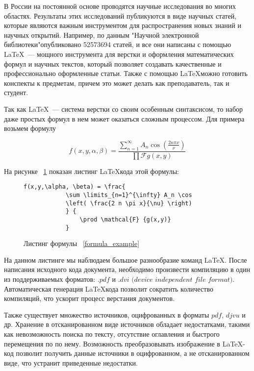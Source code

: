 \introduction %

В России на постоянной основе проводятся научные исследования во многих областях. Результаты этих исследований публикуются в виде научных статей, которые являются важным инструментом для распространения новых знаний и научных открытий.
Например, по данным "Научной электронной библиотеки"\;опубликовано 52573694 \cite{eLib} статей, и все они написаны с помощью \LaTeX ~--- мощного инструмента для верстки и оформления математических формул и научных текстов, который позволяет создавать качественные и профессионально оформленные статьи. 
Также с помощью \LaTeX \quad можно готовить конспекты к предметам, причем это может делать как преподаватель, так и студент.

Так как \LaTeX ~--- система верстки со своим особенным синтаксисом, то набор даже простых формул в нем может оказаться сложным процессом.
Для примера возьмем формулу

\begin{equation}
    \label{formula_example}
        f(x,y,\alpha, \beta) = \frac{\sum \limits_{n=1}^{\infty} 
        A_n \cos \left( \frac{2 n \pi x}{\nu} \right)} {\prod \mathcal{F} {g(x,y)} } 
\end{equation}

На рисунке ~\ref{formula_listing} показан листинг \LaTeX \quad кода этой формулы:

\begin{figure}
    \begin{lstlisting}[language={[LaTeX]Tex}]
        f(x,y,\alpha, \beta) = \frac{
            \sum \limits_{n=1}^{\infty} A_n \cos 
            \left( \frac{2 n \pi x}{\nu} \right)
            } {
                \prod \mathcal{F} {g(x,y)} 
            } 
    \end{lstlisting}
    \caption{Листинг формулы ~\ref{formula_example}}
    \label{formula_listing}
\end{figure}

На данном листинге мы наблюдаем большое разнообразие команд \LaTeX.
После написания исходного кода документа, необходимо произвести компиляцию в один из поддерживаемых форматов: $.pdf$ и $\textit{.dvi (device independent file format)}$. Автоматическая генерация \LaTeX кода позволит сократить количество компиляций, что ускорит процесс верстания документов.

Также существует множество источников, оцифрованных в форматы $pdf$, $djvu$ и др. Хранение в отсканированном виде источников обладает недостатками, такими как невозможность поиска по тексту, отсутствие оглавления и быстрого перемещения по по нему.
Возможность преобразовывать изображение в \LaTeX-код позволит получить данные источники в оцифрованном, а не отсканированном виде, что устранит приведенные недостатки.


